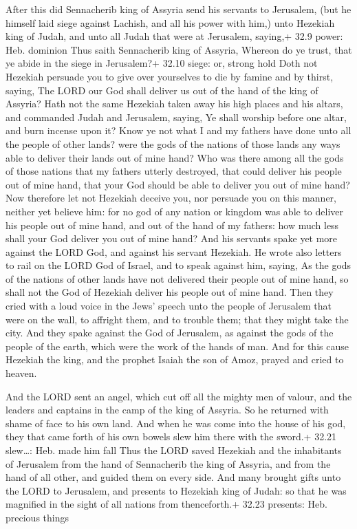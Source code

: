 After this did Sennacherib king of Assyria send his
servants to Jerusalem, (but he himself laid siege against Lachish, and
all his power with him,) unto Hezekiah king of Judah, and unto all Judah
that were at Jerusalem, saying,+ 32.9 power: Heb. dominion 
Thus saith Sennacherib king of Assyria, Whereon do ye trust, that ye
abide in the siege in Jerusalem?+ 32.10 siege: or, strong hold
 Doth not Hezekiah persuade you to give over yourselves to
die by famine and by thirst, saying, The LORD our God shall deliver us
out of the hand of the king of Assyria?  Hath not the same
Hezekiah taken away his high places and his altars, and commanded Judah
and Jerusalem, saying, Ye shall worship before one altar, and burn
incense upon it?  Know ye not what I and my fathers have
done unto all the people of other lands? were the gods of the nations of
those lands any ways able to deliver their lands out of mine hand?
 Who was there among all the gods of those nations that my
fathers utterly destroyed, that could deliver his people out of mine
hand, that your God should be able to deliver you out of mine hand?
 Now therefore let not Hezekiah deceive you, nor persuade
you on this manner, neither yet believe him: for no god of any nation or
kingdom was able to deliver his people out of mine hand, and out of the
hand of my fathers: how much less shall your God deliver you out of mine
hand?  And his servants spake yet more against the LORD
God, and against his servant Hezekiah.  He wrote also
letters to rail on the LORD God of Israel, and to speak against him,
saying, As the gods of the nations of other lands have not delivered
their people out of mine hand, so shall not the God of Hezekiah deliver
his people out of mine hand.  Then they cried with a loud
voice in the Jews' speech unto the people of Jerusalem that were on the
wall, to affright them, and to trouble them; that they might take the
city.  And they spake against the God of Jerusalem, as
against the gods of the people of the earth, which were the work of the
hands of man.  And for this cause Hezekiah the king, and
the prophet Isaiah the son of Amoz, prayed and cried to heaven.

 And the LORD sent an angel, which cut off all the mighty
men of valour, and the leaders and captains in the camp of the king of
Assyria. So he returned with shame of face to his own land. And when he
was come into the house of his god, they that came forth of his own
bowels slew him there with the sword.+ 32.21 slew\ldots: Heb. made him
fall  Thus the LORD saved Hezekiah and the inhabitants of
Jerusalem from the hand of Sennacherib the king of Assyria, and from the
hand of all other, and guided them on every side.  And many
brought gifts unto the LORD to Jerusalem, and presents to Hezekiah king
of Judah: so that he was magnified in the sight of all nations from
thenceforth.+ 32.23 presents: Heb. precious things

